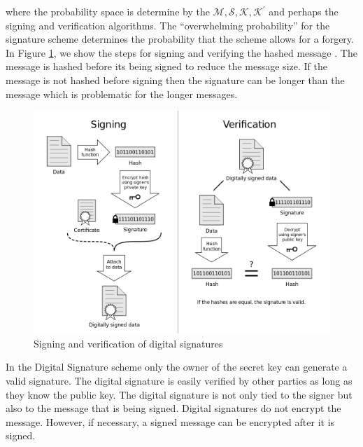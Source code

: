 	where the probability space is determine by the $\mathcal {M, S, K, K^{'}}$ and perhaps the signing and verification algorithms.
	The ``overwhelming probability'' for the signature scheme determines the probability that the scheme allows for a forgery.
	In Figure \ref{fig:digita-signature}, we show the steps for signing and verifying the hashed message \cite{DigitalSignature}. 
	The message is hashed before its being signed to reduce the message size. 
	If the message is not hashed before signing then the signature can be longer than the message which is problematic for the longer messages.
	\begin{figure}[h!]
		\centering
		\includegraphics[scale = 0.4]{images/Digital_Signature_diagram.png}
		\caption{ Signing and verification of digital signatures}
		\label{fig:digita-signature}
	\end{figure}

	In the Digital Signature scheme only the owner of the secret key can generate a valid signature.
	The digital signature is easily verified by other parties as long as they know the public key.
	The digital signature is not only tied to the signer but also to the message that is being signed.
	Digital signatures do not encrypt the message. However, if necessary, a signed message can be encrypted after it is signed.


